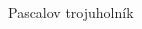 \documentclass[12pt, a4paper, landscape]{memoir}
\begin{document}
	\vspace*{-0.8em}
	\begin{center}
		{\LARGE Pascalov trojuholník}\\[1em]
		\large
		\begin{vplace}[0.5]
		\begin{adjustbox}{max width=.95\paperwidth, max height=.95\paperheight}	
			\begin{tikzpicture}
				
			\end{tikzpicture}
		\end{adjustbox}
		\end{vplace}
	\end{center}
\end{document}
